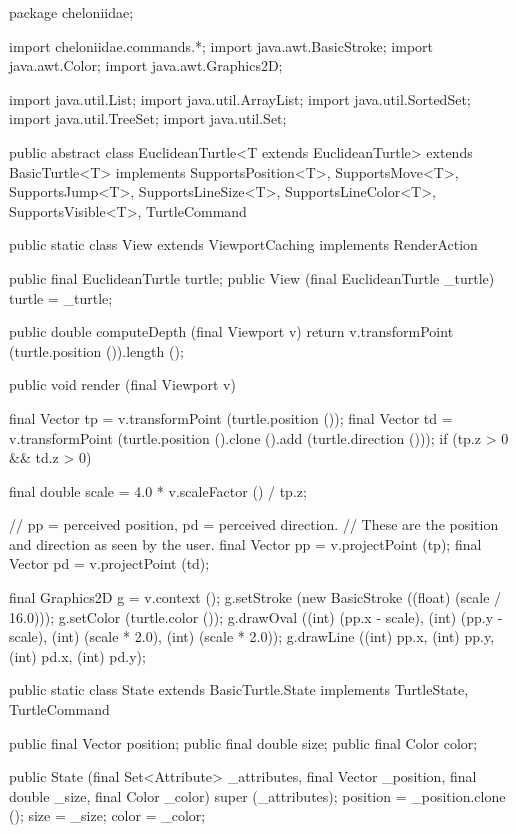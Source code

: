 \documentclass{report}
\begin{document}
\begin{javacode}
package cheloniidae;

import cheloniidae.commands.*;
import java.awt.BasicStroke;
import java.awt.Color;
import java.awt.Graphics2D;

import java.util.List;
import java.util.ArrayList;
import java.util.SortedSet;
import java.util.TreeSet;
import java.util.Set;

public abstract class EuclideanTurtle<T extends EuclideanTurtle>
              extends BasicTurtle<T>
           implements SupportsPosition<T>, SupportsMove<T>, SupportsJump<T>, SupportsLineSize<T>,
                      SupportsLineColor<T>, SupportsVisible<T>, TurtleCommand {

  public static class View extends ViewportCaching implements RenderAction {
    public final EuclideanTurtle turtle;
    public View (final EuclideanTurtle _turtle) {turtle = _turtle;}

    public double computeDepth (final Viewport v)
      {return v.transformPoint (turtle.position ()).length ();}

    public void render (final Viewport v) {
      final Vector tp = v.transformPoint (turtle.position ());
      final Vector td = v.transformPoint (turtle.position ().clone ().add (turtle.direction ()));
      if (tp.z > 0 && td.z > 0) {
        final double scale = 4.0 * v.scaleFactor () / tp.z;

        // pp = perceived position, pd = perceived direction.
        // These are the position and direction as seen by the user.
        final Vector pp = v.projectPoint (tp);
        final Vector pd = v.projectPoint (td);

        final Graphics2D g = v.context ();
        g.setStroke (new BasicStroke ((float) (scale / 16.0)));
        g.setColor  (turtle.color ());
        g.drawOval  ((int) (pp.x - scale), (int) (pp.y - scale), (int) (scale * 2.0), (int) (scale * 2.0));
        g.drawLine  ((int) pp.x, (int) pp.y, (int) pd.x, (int) pd.y);
      }
    }
  }

  public static class State extends BasicTurtle.State implements TurtleState, TurtleCommand {
    public final Vector position;
    public final double size;
    public final Color  color;

    public State (final Set<Attribute> _attributes, final Vector _position,
                  final double _size, final Color _color)
      {super (_attributes); position = _position.clone (); size = _size; color = _color;}

}}
\end{javacode}
\end{document}
